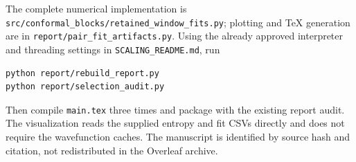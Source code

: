 The complete numerical implementation is
\texttt{src/conformal\_blocks/retained\_window\_fits.py}; plotting and TeX
generation are in \texttt{report/pair\_fit\_artifacts.py}.
Using the already approved interpreter and threading settings in
\texttt{SCALING\_README.md}, run
\begin{verbatim}
python report/rebuild_report.py
python report/selection_audit.py
\end{verbatim}
Then compile \texttt{main.tex} three times and package with the
existing report audit. The visualization reads the supplied entropy and fit
CSVs directly and does not require the wavefunction caches. The
manuscript is identified by source hash and citation, not redistributed
in the Overleaf archive.
